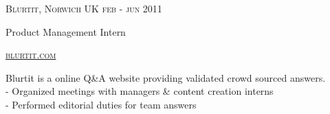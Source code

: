 {
  \textsc{\small{Blurtit, Norwich UK
    \hfill
      {\raggedleft
        feb - jun 2011
      } \\
    }
  }
  {\raggedright\large {
    Product Management Intern
  } \\}

  \textsc{\small\href{http://www.blurtit.com}{blurtit.com}}

  \normalsize{
    Blurtit is a online Q\&A website providing validated crowd sourced answers. \\
    - Organized meetings with managers \& content creation interns\\
    - Performed editorial duties for team answers
  }
}
